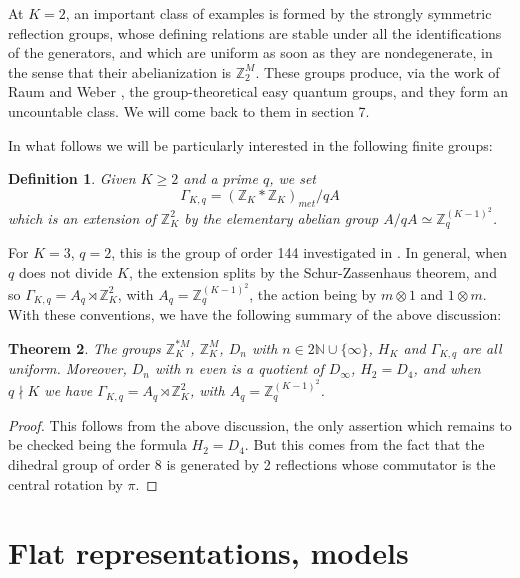 \documentclass[12pt]{amsart}
\newtheorem{theorem}{Theorem}[section]
\newtheorem{definition}[theorem]{Definition}
\theoremstyle{definition}
\begin{document}
At $K=2$, an important class of examples is formed by the strongly symmetric reflection groups, whose defining relations are stable under all the identifications of the generators, and which are uniform as soon as they are nondegenerate, in the sense that their abelianization is $\mathbb Z_2^M$. These groups produce, via the work of Raum and Weber \cite{rw2,rwe}, the group-theoretical easy quantum groups, and they form an uncountable class. We will come back to them in section 7.

In what follows we will be particularly interested in the following finite groups:

\begin{definition}
Given $K\geq2$ and a prime $q$, we set
$$\Gamma_{K,q}=(\mathbb Z_K*\mathbb Z_K)_{met}/qA$$
which is an extension of $\mathbb Z_K^2$ by the elementary abelian group $A/qA\simeq\mathbb Z_q^{(K-1)^2}$.
\end{definition}

For $K=3$, $q=2$, this is the group of order 144 investigated in \cite{bc2}. In general, when $q$ does not divide $K$, the extension splits by the Schur-Zassenhaus theorem, and so $\Gamma_{K,q}=A_q\rtimes\mathbb Z_K^2$, with $A_q=\mathbb Z_q^{(K-1)^2}$, the action being by $m\otimes1$ and $1\otimes m$. With these conventions, we have the following summary of the above discussion:

\begin{theorem}
The groups $\mathbb Z_K^{*M}$, $\mathbb Z_K^M$, $D_n$ with $n\in2\mathbb N\cup\{\infty\}$, $H_K$ and $\Gamma_{K,q}$ are all uniform. Moreover, $D_n$ with $n$ even is a quotient of $D_\infty$, $H_2=D_4$, and when $q\nmid K$ we have $\Gamma_{K,q}=A_q\rtimes\mathbb Z_K^2$, with $A_q=\mathbb Z_q^{(K-1)^2}$.
\end{theorem}

\begin{proof}
This follows from the above discussion, the only assertion which remains to be checked being the formula $H_2=D_4$. But this comes from the fact that the dihedral group of order 8 is generated by 2 reflections whose commutator is the central rotation by $\pi$.
\end{proof}

\section{Flat representations, models}
\end{document}

